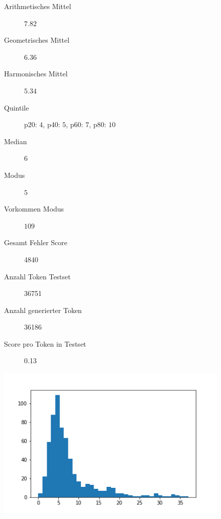 \documentclass[pdftex,a4paper,halfparskip, article]{scrartcl}
\begin{document}
\begin{figure}
\centering
\begin{minipage}{.5\textwidth}
  \centering
  \begin{description}
	\item[Arithmetisches Mittel] $7.82$	
	\item[Geometrisches Mittel] $6.36$
	\item[Harmonisches Mittel] $5.34$
	\item[Quintile] p20: $4$, p40: $5$, p60: $7$, p80: $10$
	\item[Median] $6$
	\item[Modus] $5$
	\item[Vorkommen Modus] $109$
	\item[Gesamt Fehler Score] 4840
	\item[Anzahl Token Testset] 36751 
	\item[Anzahl generierter Token] 36186
	\item[Score pro Token in Testset] 0.13
\end{description}
  \label{fig:lage_bin10}
\end{minipage}%
\begin{minipage}{.5\textwidth}
  \centering
  \includegraphics[width=1\linewidth]{predictions_bin10_histogramm}
  \label{fig:hist_bin10}
\end{minipage}
\end{figure}
\end{document}
